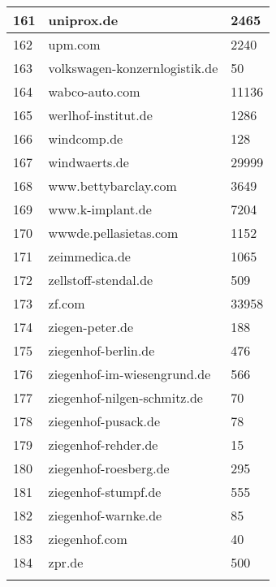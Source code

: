 \begin{longtable}{|m{0.5cm}||m{8cm}|m{5cm}|}
	\hline
	161 & uniprox.de & 2465\\
	\hline
	162 & upm.com & 2240\\
	\hline
	163 & volkswagen-konzernlogistik.de & 50\\
	\hline
	164 & wabco-auto.com & 11136\\
	\hline
	165 & werlhof-institut.de & 1286\\
	\hline
	166 & windcomp.de & 128\\
	\hline
	167 & windwaerts.de & 29999\\
	\hline
	168 & www.bettybarclay.com & 3649\\
	\hline
	169 & www.k-implant.de & 7204\\
	\hline
	170 & wwwde.pellasietas.com & 1152\\
	\hline
	171 & zeimmedica.de & 1065\\
	\hline
	172 & zellstoff-stendal.de & 509\\
	\hline
	173 & zf.com & 33958\\
	\hline
	174 & ziegen-peter.de & 188\\
	\hline
	175 & ziegenhof-berlin.de & 476\\
	\hline
	176 & ziegenhof-im-wiesengrund.de & 566\\
	\hline
	177 & ziegenhof-nilgen-schmitz.de & 70\\
	\hline
	178 & ziegenhof-pusack.de & 78\\
	\hline
	179 & ziegenhof-rehder.de & 15\\
	\hline
	180 & ziegenhof-roesberg.de & 295\\
	\hline
	181 & ziegenhof-stumpf.de & 555\\
	\hline
	182 & ziegenhof-warnke.de & 85\\
	\hline
	183 & ziegenhof.com & 40\\
	\hline
	184 & zpr.de & 500\\
	\lasthline
\end{longtable}
%
